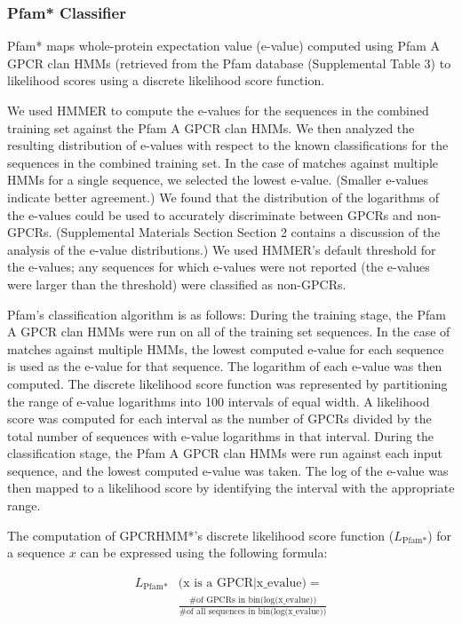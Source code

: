 \subsubsection{Pfam* Classifier}
Pfam* maps whole-protein expectation value (e-value) computed using Pfam A GPCR clan HMMs (retrieved from the Pfam database \cite{Punta2012} (Supplemental Table 3) to likelihood scores using a discrete likelihood score function.

We used HMMER \cite{Finn2011} to compute the e-values for the sequences in the combined training set against the Pfam A GPCR clan HMMs. We then analyzed the resulting distribution of e-values with respect to the known classifications for the sequences in the combined training set.  In the case of matches against multiple HMMs for a single sequence, we selected the lowest e-value.  (Smaller e-values indicate better agreement.)  We found that the distribution of the logarithms of the e-values could be used to accurately discriminate between GPCRs and non-GPCRs. (Supplemental Materials Section Section 2 contains a discussion of the analysis of the e-value distributions.) We used HMMER's default threshold for the e-values; any sequences for which e-values were not reported (the e-values were larger than the threshold) were classified as non-GPCRs.

Pfam's classification algorithm is as follows: During the training stage, the Pfam A GPCR clan HMMs were run on all of the training set sequences.  In the case of matches against multiple HMMs, the lowest computed e-value for each sequence is used as the e-value for that sequence.  The logarithm of each e-value was then computed.  The discrete likelihood score function was represented by partitioning the range of e-value logarithms into 100 intervals of equal width.  A likelihood score was computed for each interval as the number of GPCRs divided by the total number of sequences with e-value logarithms in that interval.  During the classification stage, the Pfam A GPCR clan HMMs were run against each input sequence, and the lowest computed e-value was taken.  The log of the e-value was then mapped to a likelihood score by identifying the interval with the appropriate range. 

The computation of GPCRHMM*'s discrete likelihood score function ($L_{\text{Pfam*}}$) for a sequence $x$ can be expressed using the following formula: 


\begin{align*}
L_{\text{Pfam*}}&\text{(x is a GPCR} | \text{x\_evalue)} =\\
&\frac{\text{\# of GPCRs in bin(log(x\_evalue))}}{\text{\# of all sequences in bin(log(x\_evalue))}}
\end{align*}

